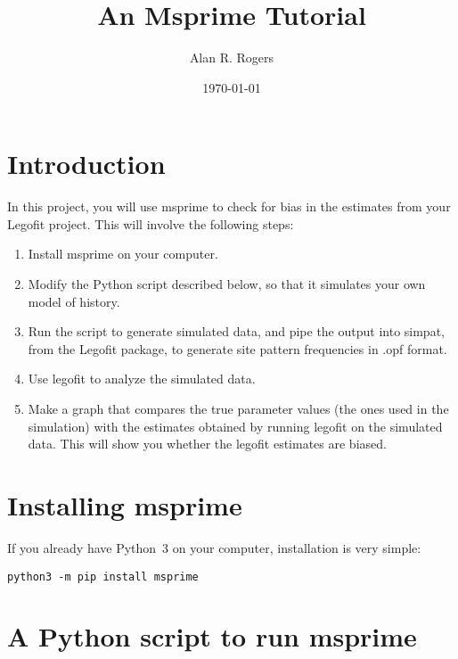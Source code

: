 \documentclass[11pt]{article}
\begin{document}
\title{An Msprime Tutorial}
\author{Alan R. Rogers}
\date{\today}
\maketitle

\section{Introduction}
\label{sec.intro}
In this project, you will use msprime \citep{Kelleher:PLO-12-1} to
check for bias in the estimates from your Legofit project. This will
involve the following steps:
\begin{enumerate}
\item Install msprime on your computer.
\item Modify the Python script described below, so that it simulates
  your own model of history.
\item Run the script to generate simulated data, and pipe the output
  into simpat, from the Legofit package, to generate site pattern
  frequencies in .opf format.
\item Use legofit to analyze the simulated data.
\item Make a graph that compares the true parameter values (the ones
  used in the simulation) with the estimates obtained by running
  legofit on the simulated data. This will show you whether the
  legofit estimates are biased.
\end{enumerate}

\section{Installing msprime}
If you already have Python~3 on your computer, installation is very
simple:
\begin{verbatim}
python3 -m pip install msprime
\end{verbatim}


\section{A Python script to run msprime}
\end{document}
